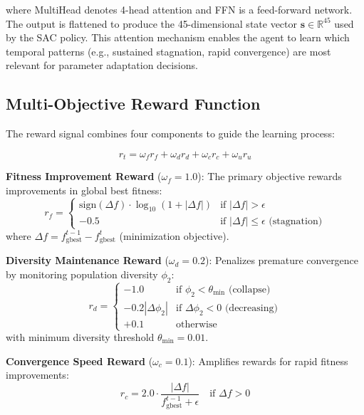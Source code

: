 \documentclass[fleqn,10pt]{wlscirep}
\begin{document}
where MultiHead denotes 4-head attention and FFN is a feed-forward network.
The output is flattened to produce the 45-dimensional state vector $\mathbf{s} \in \mathbb{R}^{45}$ used by the SAC policy.
This attention mechanism enables the agent to learn which temporal patterns (e.g., sustained stagnation, rapid convergence) are most relevant for parameter adaptation decisions.

\subsection*{Multi-Objective Reward Function}

The reward signal combines four components to guide the learning process:

\begin{equation}
r_t = \omega_f r_f + \omega_d r_d + \omega_c r_c + \omega_u r_u
\label{eq:reward}
\end{equation}

\textbf{Fitness Improvement Reward} ($\omega_f = 1.0$): The primary objective rewards improvements in global best fitness:
\begin{equation}
r_f = \begin{cases}
\text{sign}(\Delta f) \cdot \log_{10}(1 + |\Delta f|) & \text{if } |\Delta f| > \epsilon \\
-0.5 & \text{if } |\Delta f| \leq \epsilon \text{ (stagnation)}
\end{cases}
\end{equation}
where $\Delta f = f_{\text{gbest}}^{t-1} - f_{\text{gbest}}^{t}$ (minimization objective).

\textbf{Diversity Maintenance Reward} ($\omega_d = 0.2$): Penalizes premature convergence by monitoring population diversity $\phi_2$:
\begin{equation}
r_d = \begin{cases}
-1.0 & \text{if } \phi_2 < \theta_{\min} \text{ (collapse)} \\
-0.2 |\Delta \phi_2| & \text{if } \Delta \phi_2 < 0 \text{ (decreasing)} \\
+0.1 & \text{otherwise}
\end{cases}
\end{equation}
with minimum diversity threshold $\theta_{\min} = 0.01$.

\textbf{Convergence Speed Reward} ($\omega_c = 0.1$): Amplifies rewards for rapid fitness improvements:
\begin{equation}
r_c = 2.0 \cdot \frac{|\Delta f|}{f_{\text{gbest}}^{t-1} + \epsilon} \quad \text{if } \Delta f > 0
\end{equation}
\end{document}
